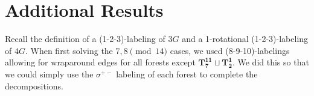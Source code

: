 \chapter{Additional Results} \label{chap:Additional Results}

Recall the definition of a (1-2-3)-labeling of $3G$ and a 1-rotational (1-2-3)-labeling of $4G$. When first solving the $7,8\pmod{14}$ cases, we used (8-9-10)-labelings allowing for wraparound edges for all forests except $\mathbf{T_{7}^{11}\sqcup T_{2}^{1}}$. We did this so that we could simply use the $\sigma^{+-}$ labeling of each forest to complete the decompositions.







